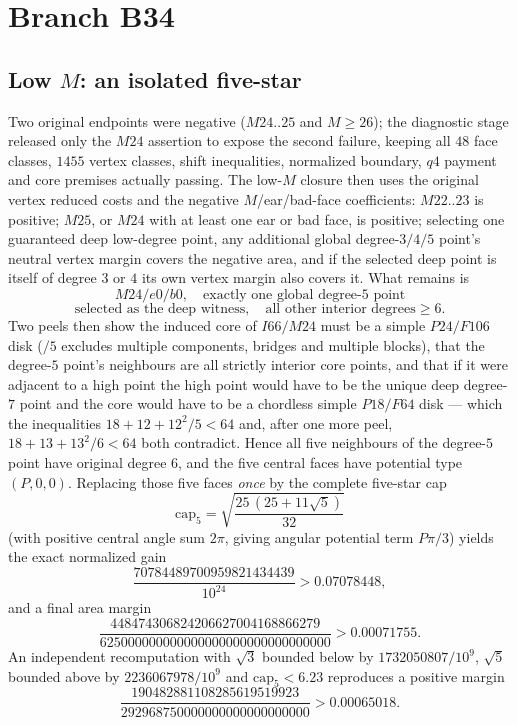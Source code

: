 \section{Branch B34}

\subsection{Low $M$: an isolated five-star}

Two original endpoints were negative ($M24..25$ and $M\ge26$); the diagnostic stage released only
the $M24$ assertion to expose the second failure, keeping all $48$ face classes, $1455$ vertex
classes, shift inequalities, normalized boundary, $q4$ payment and core premises actually passing.
The low-$M$ closure then uses the original vertex reduced costs and the negative $M$/ear/bad-face
coefficients: $M22..23$ is positive; $M25$, or $M24$ with at least one ear or bad face, is positive;
selecting one guaranteed deep low-degree point, any additional global degree-$3/4/5$ point's neutral
vertex margin covers the negative area, and if the selected deep point is itself of degree $3$ or $4$
its own vertex margin also covers it. What remains is
\[
M24/e0/b0,\quad\text{exactly one global degree-}5\text{ point}
\]
\[
\text{selected as the deep witness},\quad\text{all other interior degrees}\ge6 .
\]
Two peels then show the induced core of $I66/M24$ must be a simple $P24/F106$ disk ($/5$ excludes
multiple components, bridges and multiple blocks), that the degree-$5$ point's neighbours are all
strictly interior core points, and that if it were adjacent to a high point the high point would have
to be the unique deep degree-$7$ point and the core would have to be a chordless simple $P18/F64$
disk --- which the inequalities $18+12+12^2/5<64$ and, after one more peel,
$18+13+13^2/6<64$ both contradict. Hence all five neighbours of the degree-$5$ point have original
degree $6$, and the five central faces have potential type $(P,0,0)$. Replacing those five faces
\emph{once} by the complete five-star cap
\[
\mathrm{cap}_5=\sqrt{\frac{25\,(25+11\sqrt5)}{32}}
\]
(with positive central angle sum $2\pi$, giving angular potential term $P\pi/3$) yields the exact
normalized gain
\[
\frac{70784489700959821434439}{10^{24}}>0.07078448,
\]
and a final area margin
\[
\frac{448474306824206627004168866279}{625000000000000000000000000000000}>0.00071755 .
\]
An independent recomputation with $\sqrt3$ bounded below by $1732050807/10^9$, $\sqrt5$ bounded
above by $2236067978/10^9$ and $\mathrm{cap}_5<6.23$ reproduces a positive margin
\[
\frac{190482881108285619519923}{292968750000000000000000000}>0.00065018 .
\]

